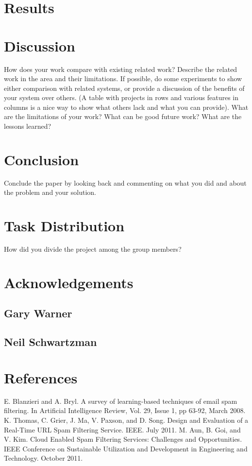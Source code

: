 \documentclass[11pt]{article}
\begin{document}
\begin{multicols}{2}
  \section{Results}

  \section{Discussion}
   How does your work compare with existing related work? Describe the related work in the area and their limitations. If possible, do some experiments to
   show either comparison with related systems, or provide a discussion of the benefits of your system over others. (A table with projects in rows and
   various features in columns is a nice way to show what others lack and what you can provide). What are the limitations of your work? What can be good
   future work? What are the lessons learned?
 
  \section{Conclusion}
  Conclude the paper by looking back and commenting on what you did and about the problem and your solution.
  
  \section{Task Distribution}
 How did you divide the project among the group members?

  \section*{Acknowledgements}

  \subsection*{Gary Warner}

  \subsection*{Neil Schwartzman}

  \section*{References}
  E. Blanzieri and A. Bryl. A survey of learning-based techniques of email spam filtering. In Artificial Intelligence Review, Vol. 29, Issue 1, pp 63-92, March 2008.
K. Thomas, C. Grier, J. Ma, V. Paxson, and D. Song. Design and Evaluation of a Real-Time URL Spam Filtering Service. IEEE. July 2011.
M. Aun, B. Goi, and V. Kim. Cloud Enabled Spam Filtering Services: Challenges and Opportunities. IEEE Conference on Sustainable Utilization and Development in Engineering and Technology. October 2011.

\end{multicols} 
\end{document}
